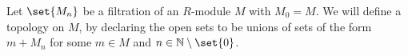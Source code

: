 Let $\set{M_n}$ be a filtration of  an $R$-module $M$ with $M_0 = M$. We will
define a topology on $M$, by declaring the open sets to be unions of sets of the
form $m + M_n$ for some $m \in M$ and $n \in \mathbb{N}\setminus\set{0}$.
